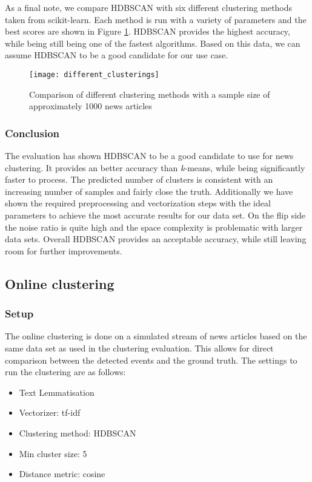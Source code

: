 As a final note, we compare HDBSCAN with six different clustering methods taken from scikit-learn. Each method is run with a variety of parameters and the best scores are shown in Figure \ref{fig:different_clusterings}. HDBSCAN provides the highest accuracy, while being still being one of the fastest algorithms. Based on this data, we can assume HDBSCAN to be a good candidate for our use case.

\begin{figure}[h]
    \centering
    \texttt{[image: different\_clusterings]}
    \caption{Comparison of different clustering methods with a sample size of approximately 1000 news articles}
    \label{fig:different_clusterings}
\end{figure}

\subsubsection{Conclusion}

The evaluation has shown HDBSCAN to be a good candidate to use for news clustering. It provides an better accuracy than \textit{k}-means, while being significantly faster to process. The predicted number of clusters is consistent with an increasing number of samples and fairly close the truth. Additionally we have shown the required preprocessing and vectorization steps with the ideal parameters to achieve the most accurate results for our data set. On the flip side the noise ratio is quite high and the space complexity is problematic with larger data sets. Overall HDBSCAN provides an acceptable accuracy, while still leaving room for further improvements.

\subsection{Online clustering}

\subsubsection{Setup}

The online clustering is done on a simulated stream of news articles based on the same data set as used in the clustering evaluation. This allows for direct comparison between the detected events and the ground truth. The settings to run the clustering are as follows:

\begin{itemize}
    \item Text Lemmatisation
    \item Vectorizer: tf-idf
    \item Clustering method: HDBSCAN
    \item Min cluster size: 5
    \item Distance metric: cosine
\end{itemize}

